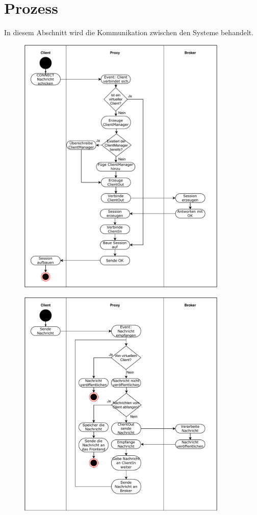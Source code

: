 \section{Prozess}
In diesem Abschnitt wird die Kommunikation zwischen den Systeme behandelt.
    \begin{figure}[h]%
        \centering
        \includegraphics[width=10cm]{tex/bilder/4_konzept/Activity_Connect.pdf}
        \label{fig:system_frontend}
    \end{figure}
    \begin{figure}[h]%
        \centering
        \includegraphics[width=10cm]{tex/bilder/4_konzept/Activity_Message.pdf}
        \label{fig:system_frontend}
    \end{figure}
